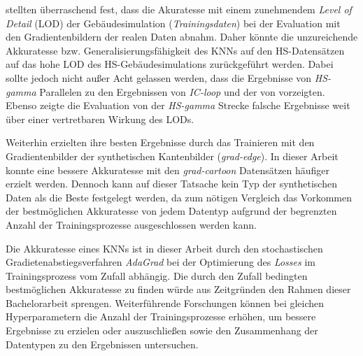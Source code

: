 \citet{acharyaBIMPoseNetIndoorCamera2019} stellten überraschend fest, dass die Akuratesse mit einem zunehmendem \textit{Level of Detail} (LOD) der Gebäudesimulation (\textit{Trainingsdaten}) bei der Evaluation mit den Gradientenbildern der realen Daten abnahm. Daher könnte die unzureichende Akkuratesse bzw. Generalisierungsfähigkeit des KNNs auf den HS-Datensätzen auf das hohe LOD des HS-Gebäudesimulations zurückgeführt werden. Dabei sollte jedoch nicht außer Acht gelassen werden, dass die Ergebnisse von \textit{HS-gamma} Parallelen zu den Ergebnissen von \textit{IC-loop} und der von \citet{acharyaBIMPoseNetIndoorCamera2019} vorzeigten.  Ebenso zeigte die Evaluation von der \textit{HS-gamma} Strecke falsche Ergebnisse weit über einer vertretbaren Wirkung des LODs.









Weiterhin erzielten \citet{acharyaBIMPoseNetIndoorCamera2019} ihre besten Ergebnisse durch das Trainieren mit den Gradientenbilder der synthetischen Kantenbilder (\textit{grad-edge}). In dieser Arbeit konnte eine bessere Akkuratesse mit den \textit{grad-cartoon} Datensätzen häufiger erzielt werden. Dennoch kann auf dieser Tatsache kein Typ der synthetischen Daten als die Beste festgelegt werden, da zum nötigen Vergleich das Vorkommen der bestmöglichen Akkuratesse von jedem Datentyp aufgrund der begrenzten Anzahl der Trainingsprozesse ausgeschlossen werden kann. 
 








Die Akkuratesse eines KNNs ist in dieser Arbeit durch den stochastischen Gradietenabstiegsverfahren \textit{AdaGrad} bei der Optimierung des \textit{Losses} im Trainingsprozess vom Zufall abhängig. Die durch den Zufall bedingten bestmöglichen Akkuratesse zu finden würde aus Zeitgründen den Rahmen dieser Bachelorarbeit sprengen. Weiterführende Forschungen können bei gleichen Hyperparametern die Anzahl der Trainingsprozesse erhöhen, um bessere Ergebnisse zu erzielen oder auszuschließen sowie den Zusammenhang der Datentypen zu den Ergebnissen untersuchen.


